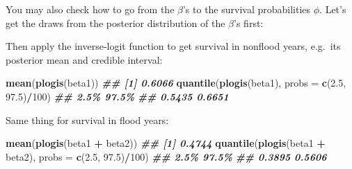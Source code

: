 \documentclass[
  12pt,
]{krantz}
\newenvironment{Shaded}{\begin{snugshade}}{\end{snugshade}}
\newcommand{\AttributeTok}[1]{\textcolor[rgb]{0.13,0.29,0.53}{#1}}
\newcommand{\CommentTok}[1]{\textcolor[rgb]{0.56,0.35,0.01}{\textit{#1}}}
\newcommand{\DecValTok}[1]{\textcolor[rgb]{0.00,0.00,0.81}{#1}}
\newcommand{\DocumentationTok}[1]{\textcolor[rgb]{0.56,0.35,0.01}{\textbf{\textit{#1}}}}
\newcommand{\FloatTok}[1]{\textcolor[rgb]{0.00,0.00,0.81}{#1}}
\newcommand{\FunctionTok}[1]{\textcolor[rgb]{0.13,0.29,0.53}{\textbf{#1}}}
\newcommand{\NormalTok}[1]{#1}
\newcommand{\OtherTok}[1]{\textcolor[rgb]{0.56,0.35,0.01}{#1}}
\newcommand{\SpecialCharTok}[1]{\textcolor[rgb]{0.81,0.36,0.00}{\textbf{#1}}}
\newcommand{\StringTok}[1]{\textcolor[rgb]{0.31,0.60,0.02}{#1}}
\begin{document}
You may also check how to go from the \(\beta\)'s to the survival probabilities \(\phi\). Let's get the draws from the posterior distribution of the \(\beta\)'s first:

\begin{Shaded}
\end{Shaded}

Then apply the inverse-logit function to get survival in nonflood years, e.g.~its posterior mean and credible interval:

\begin{Shaded}
\begin{Highlighting}[]
\FunctionTok{mean}\NormalTok{(}\FunctionTok{plogis}\NormalTok{(beta1))}
\DocumentationTok{\#\# [1] 0.6066}
\FunctionTok{quantile}\NormalTok{(}\FunctionTok{plogis}\NormalTok{(beta1), }\AttributeTok{probs =} \FunctionTok{c}\NormalTok{(}\FloatTok{2.5}\NormalTok{, }\FloatTok{97.5}\NormalTok{)}\SpecialCharTok{/}\DecValTok{100}\NormalTok{)}
\DocumentationTok{\#\#   2.5\%  97.5\% }
\DocumentationTok{\#\# 0.5435 0.6651}
\end{Highlighting}
\end{Shaded}

Same thing for survival in flood years:

\begin{Shaded}
\begin{Highlighting}[]
\FunctionTok{mean}\NormalTok{(}\FunctionTok{plogis}\NormalTok{(beta1 }\SpecialCharTok{+}\NormalTok{ beta2))}
\DocumentationTok{\#\# [1] 0.4744}
\FunctionTok{quantile}\NormalTok{(}\FunctionTok{plogis}\NormalTok{(beta1 }\SpecialCharTok{+}\NormalTok{ beta2), }\AttributeTok{probs =} \FunctionTok{c}\NormalTok{(}\FloatTok{2.5}\NormalTok{, }\FloatTok{97.5}\NormalTok{)}\SpecialCharTok{/}\DecValTok{100}\NormalTok{)}
\DocumentationTok{\#\#   2.5\%  97.5\% }
\DocumentationTok{\#\# 0.3895 0.5606}
\end{Highlighting}
\end{Shaded}
\end{document}
